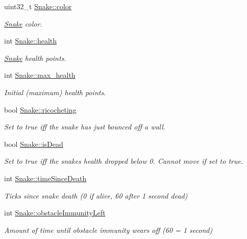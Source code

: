 \begin{DoxyCompactItemize}
uint32\+\_\+t \mbox{\hyperlink{group__snake_gaeaaf26de3f02db45a8bab738d4b2ca64}{Snake\+::color}}
\begin{DoxyCompactList}\small\item\em \mbox{\hyperlink{struct_snake}{Snake}} color. \end{DoxyCompactList}\item 
int \mbox{\hyperlink{group__snake_ga9579d3c93826054b42af664d0a4919d6}{Snake\+::health}}
\begin{DoxyCompactList}\small\item\em \mbox{\hyperlink{struct_snake}{Snake}} health points. \end{DoxyCompactList}\item 
int \mbox{\hyperlink{group__snake_ga1150d62946b0817287c3a23597993d08}{Snake\+::max\+\_\+health}}
\begin{DoxyCompactList}\small\item\em Initial (maximum) health points. \end{DoxyCompactList}\item 
bool \mbox{\hyperlink{group__snake_ga7fa12626da8070f765499c9dae661271}{Snake\+::ricocheting}}
\begin{DoxyCompactList}\small\item\em Set to true iff the snake has just bounced off a wall. \end{DoxyCompactList}\item 
bool \mbox{\hyperlink{group__snake_ga781e80a4c24c09fbe284d49097e6c334}{Snake\+::is\+Dead}}
\begin{DoxyCompactList}\small\item\em Set to true iff the snake\textquotesingle{}s health dropped below 0. Cannot move if set to true. \end{DoxyCompactList}\item 
int \mbox{\hyperlink{group__snake_gad5771c4485a61c0bbbc101ce0b1fe81f}{Snake\+::time\+Since\+Death}}
\begin{DoxyCompactList}\small\item\em Ticks since snake death (0 if alive, 60 after 1 second dead) \end{DoxyCompactList}\item 
int \mbox{\hyperlink{group__snake_ga7296bc0cf6f2410a20eb48fda726a8f6}{Snake\+::obstacle\+Immunity\+Left}}
\begin{DoxyCompactList}\small\item\em Amount of time until obstacle immunity wears off (60 = 1 second) \end{DoxyCompactList}\item 

\end{DoxyCompactItemize}

